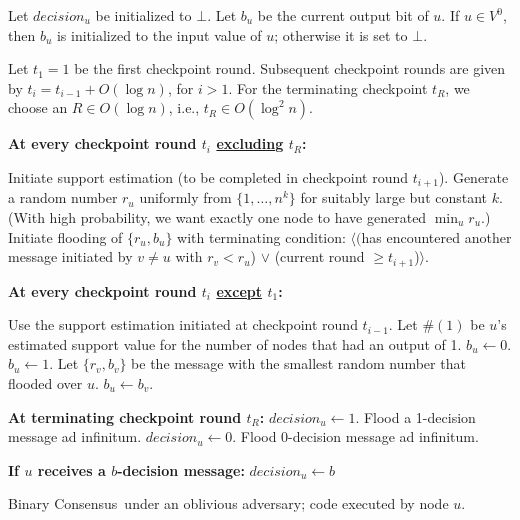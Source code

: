 \documentclass[leqno,11pt]{article}
\renewcommand{\geq}{\geqslant}
\renewcommand{\ge}{\geqslant}
\renewcommand{\leq}{\leqslant}
\newcommand{\set}[1]{\{#1\}}
\newcommand{\la}{\leftarrow}
\newcommand{\bc}{{\sc Binary Consensus}}
\begin{document}
\begin{algorithm}[h]
  \begin{algorithmic}[1]
  \footnotesize
\EMPTY Let $decision_u$ be initialized to $\bot$.
  \EMPTY
  Let $b_u$ be the current output bit of $u$. If $u \in V^0$, then $b_u$ is
  initialized to the input value of $u$; otherwise it is set to $\bot$. 
  
  Let $t_1 = 1$ be the first checkpoint round. Subsequent checkpoint rounds are
  given by  $t_i = t_{i-1} + O(\log n)$, for $i > 1$. 
  For the terminating checkpoint $t_R$, we choose an $R \in O(\log n)$, i.e.,
  $t_R\in O(\log^2n)$.
\EMPTY 
  \item[\bf At every checkpoint round $t_i$ \underline{excluding} $t_R$:] 
    
  \STATE Initiate support estimation (to be completed in checkpoint round $t_{i+1}$).
  \STATE Generate a random number $r_u$ uniformly from $\set{1, \ldots, n^k}$ for suitably large but constant $k$. (With high probability, we want exactly one node to have generated $\min_u r_u$.)
  \STATE Initiate flooding of $\set{r_u, b_u}$ with terminating condition: {\sc
  $\langle($has encountered another message initiated by $v \ne u$ with $r_v <
  r_u$) $\vee$ (current round $\ge t_{i+1}$)$\rangle$.}
  
  \EMPTY
  \item[\bf At every checkpoint round $t_i$ \underline{except} $t_1$:] 
  
  \STATE Use the support estimation initiated at checkpoint round $t_{i-1}$. Let
  $\#(1)$ be $u$'s estimated support value for the number of nodes that had an
  output of 1. 
  \IF{$\#(1) \leq  \frac{1}{4}n$} \label{line:onequarter}
    \STATE $b_u \leftarrow 0$.
  \ELSIF{$\#(1) \geq \frac{3}{4}n$}
    \STATE $b_u \leftarrow 1$.
    \STATE Let $\set{r_v, b_v}$ be the message with the smallest random number that flooded over $u$.
    \STATE $b_u \leftarrow b_v$.
  \ENDIF
  
  \EMPTY
  \item[\bf At terminating checkpoint round $t_R$:]
  \IF{$\#(1) \ge  \frac{n}{2}$} \label{line:oneHighOblivious}
   		\STATE $decision_u \la 1$.
      \STATE Flood a 1-decision message ad infinitum.
  \ELSIF{$\#(0) \ge \frac{n}{2}$}
   		\STATE $decision_u \la 0$.
      \STATE Flood 0-decision message ad infinitum.
\ENDIF
  \EMPTY
  \item[\bf If $u$ receives a $b$-decision message:]
    \STATE $decision_u \la b$
  \end{algorithmic}
  \caption{\bc\ under an oblivious adversary; code executed by node $u$.} \label{alg:bc}
\end{algorithm}
\normalsize
\end{document}
